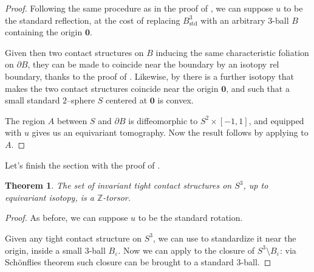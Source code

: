 \documentclass[a4paper, 11pt]{amsart}
\theoremstyle{plain}
\newtheorem{thmR}{Theorem}
\theoremstyle{definition}
\newcommand{\sd}{\text{std}}
\newcommand{\zero}{\mathbf{0}}
\newcommand{\Z}{\mathbb{Z}}
\renewcommand{\epsilon}{\varepsilon}
\begin{document}
\begin{proof}
	Following the same procedure as in the proof of , we can suppose $u$ to be the standard reflection, at the cost of replacing $B^3_{\sd}$ with an arbitrary 3-ball $B$ containing the origin $\zero$.
	
	Given then two contact structures on $B$ inducing the same characteristic foliation on $\partial B$, they can be made to coincide near the boundary by an isotopy rel boundary, thanks to the proof of . Likewise, by  there is a further isotopy that makes the two contact structures coincide near the origin $\zero$, and such that a small standard $2$–sphere $S$ centered at $\zero$ is convex. 
	
	The region $A$ between $S$ and $\partial B$ is diffeomorphic to $S^2 \times [-1,1]$, and equipped with $u$ gives us an equivariant tomography. Now the result follows by applying  to $A$.
\end{proof}
Let's finish the section with the proof of .
\addtocounter{thmR}{-1}
\begin{thmR}
	The set of invariant tight contact structures on $S^3$, up to equivariant isotopy, is a $\Z$-torsor.
\end{thmR}
\begin{proof}
	As before, we can suppose $u$ to be the standard rotation.
	
	Given any tight contact structure on $S^3$, we can use  to standardize it near the origin, inside a small 3-ball $B_{\epsilon}$. Now we can apply  to the closure of $S^3 \setminus B_{\epsilon}$: via Sch\"{o}nflies theorem such closure can be brought to a standard 3-ball.
\end{proof}
\printbibliography
\end{document}
